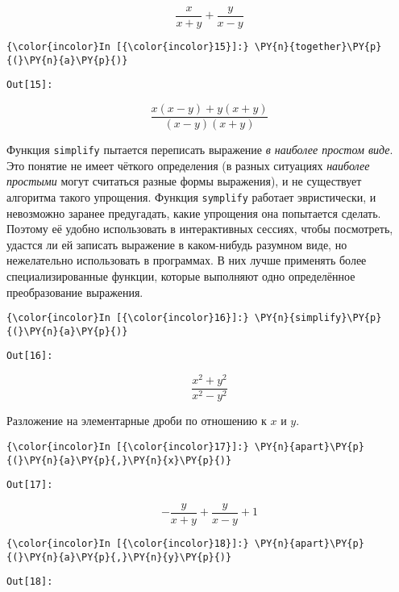     \[\frac{x}{x + y} + \frac{y}{x - y}\]

    

    \begin{Verbatim}[commandchars=\\\{\}]
{\color{incolor}In [{\color{incolor}15}]:} \PY{n}{together}\PY{p}{(}\PY{n}{a}\PY{p}{)}
\end{Verbatim}
\texttt{\color{outcolor}Out[{\color{outcolor}15}]:}
    
    \[\frac{x \left(x - y\right) + y \left(x + y\right)}{\left(x - y\right) \left(x + y\right)}\]

    

    Функция \texttt{simplify} пытается переписать выражение \emph{в наиболее
простом виде}. Это понятие не имеет чёткого определения (в разных
ситуациях \emph{наиболее простыми} могут считаться разные формы
выражения), и не существует алгоритма такого упрощения. Функция
\texttt{symplify} работает эвристически, и невозможно заранее
предугадать, какие упрощения она попытается сделать. Поэтому её удобно
использовать в интерактивных сессиях, чтобы посмотреть, удастся ли ей
записать выражение в каком-нибудь разумном виде, но нежелательно
использовать в программах. В них лучше применять более
специализированные функции, которые выполняют одно определённое
преобразование выражения.

    \begin{Verbatim}[commandchars=\\\{\}]
{\color{incolor}In [{\color{incolor}16}]:} \PY{n}{simplify}\PY{p}{(}\PY{n}{a}\PY{p}{)}
\end{Verbatim}
\texttt{\color{outcolor}Out[{\color{outcolor}16}]:}
    
    \[\frac{x^{2} + y^{2}}{x^{2} - y^{2}}\]

    

    Разложение на элементарные дроби по отношению к \(x\) и \(y\).

    \begin{Verbatim}[commandchars=\\\{\}]
{\color{incolor}In [{\color{incolor}17}]:} \PY{n}{apart}\PY{p}{(}\PY{n}{a}\PY{p}{,}\PY{n}{x}\PY{p}{)}
\end{Verbatim}
\texttt{\color{outcolor}Out[{\color{outcolor}17}]:}
    
    \[- \frac{y}{x + y} + \frac{y}{x - y} + 1\]

    

    \begin{Verbatim}[commandchars=\\\{\}]
{\color{incolor}In [{\color{incolor}18}]:} \PY{n}{apart}\PY{p}{(}\PY{n}{a}\PY{p}{,}\PY{n}{y}\PY{p}{)}
\end{Verbatim}
\texttt{\color{outcolor}Out[{\color{outcolor}18}]:}
    
